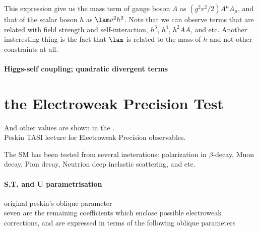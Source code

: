 This expression give us the mass term of gauge boson $A$ as $(g^2 v^2/2)A^\mu A_\mu$, and that of the scalar boson $h$ as $\lam v^2 h^2$. 
Note that we can observe terms that are related with field strength and self-interaction, $h^3$, $h^4$, $h^2 AA$, and etc.
Another insteresting thing is the fact that $\lam$ is related to the mass of $h$ and not other constraints at all. 



\paragraph{Higgs-self coupling; quadratic divergent terms}
\section{the Electroweak Precision Test}
% 
 
 
And other values are shown in the . \\
  Peskin TASI lecture for Electroweak Precision observables.
 
The SM has been tested from several ineterations: polarization in $\beta$-decay, Muon decay, Pion decay, 
 Neutrion deep inelastic scattering, and etc.

 
\paragraph{S,T, and U parametrisation}
 original peskin's oblique parameter \\

seven are the remaining coefficients which enclose possible
electroweak corrections, and are expressed in terms of the following oblique parameters\\


